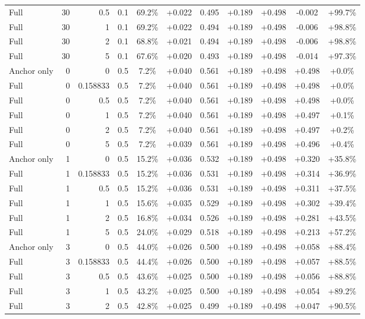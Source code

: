 \begin{table}[htbp]
\begin{tabular}{lrrrccccccc}
Full & 30 & 0.5 & 0.1 & 69.2\% & +0.022 & 0.495 & +0.189 & +0.498 & -0.002 & +99.7\% \\
Full & 30 & 1 & 0.1 & 69.2\% & +0.022 & 0.494 & +0.189 & +0.498 & -0.006 & +98.8\% \\
Full & 30 & 2 & 0.1 & 68.8\% & +0.021 & 0.494 & +0.189 & +0.498 & -0.006 & +98.8\% \\
Full & 30 & 5 & 0.1 & 67.6\% & +0.020 & 0.493 & +0.189 & +0.498 & -0.014 & +97.3\% \\
Anchor only & 0 & 0 & 0.5 & 7.2\% & +0.040 & 0.561 & +0.189 & +0.498 & +0.498 & +0.0\% \\
Full & 0 & 0.158833 & 0.5 & 7.2\% & +0.040 & 0.561 & +0.189 & +0.498 & +0.498 & +0.0\% \\
Full & 0 & 0.5 & 0.5 & 7.2\% & +0.040 & 0.561 & +0.189 & +0.498 & +0.498 & +0.0\% \\
Full & 0 & 1 & 0.5 & 7.2\% & +0.040 & 0.561 & +0.189 & +0.498 & +0.497 & +0.1\% \\
Full & 0 & 2 & 0.5 & 7.2\% & +0.040 & 0.561 & +0.189 & +0.498 & +0.497 & +0.2\% \\
Full & 0 & 5 & 0.5 & 7.2\% & +0.039 & 0.561 & +0.189 & +0.498 & +0.496 & +0.4\% \\
Anchor only & 1 & 0 & 0.5 & 15.2\% & +0.036 & 0.532 & +0.189 & +0.498 & +0.320 & +35.8\% \\
Full & 1 & 0.158833 & 0.5 & 15.2\% & +0.036 & 0.531 & +0.189 & +0.498 & +0.314 & +36.9\% \\
Full & 1 & 0.5 & 0.5 & 15.2\% & +0.036 & 0.531 & +0.189 & +0.498 & +0.311 & +37.5\% \\
Full & 1 & 1 & 0.5 & 15.6\% & +0.035 & 0.529 & +0.189 & +0.498 & +0.302 & +39.4\% \\
Full & 1 & 2 & 0.5 & 16.8\% & +0.034 & 0.526 & +0.189 & +0.498 & +0.281 & +43.5\% \\
Full & 1 & 5 & 0.5 & 24.0\% & +0.029 & 0.518 & +0.189 & +0.498 & +0.213 & +57.2\% \\
Anchor only & 3 & 0 & 0.5 & 44.0\% & +0.026 & 0.500 & +0.189 & +0.498 & +0.058 & +88.4\% \\
Full & 3 & 0.158833 & 0.5 & 44.4\% & +0.026 & 0.500 & +0.189 & +0.498 & +0.057 & +88.5\% \\
Full & 3 & 0.5 & 0.5 & 43.6\% & +0.025 & 0.500 & +0.189 & +0.498 & +0.056 & +88.8\% \\
Full & 3 & 1 & 0.5 & 43.2\% & +0.025 & 0.500 & +0.189 & +0.498 & +0.054 & +89.2\% \\
Full & 3 & 2 & 0.5 & 42.8\% & +0.025 & 0.499 & +0.189 & +0.498 & +0.047 & +90.5\% \\

\end{tabular}
\end{table}

